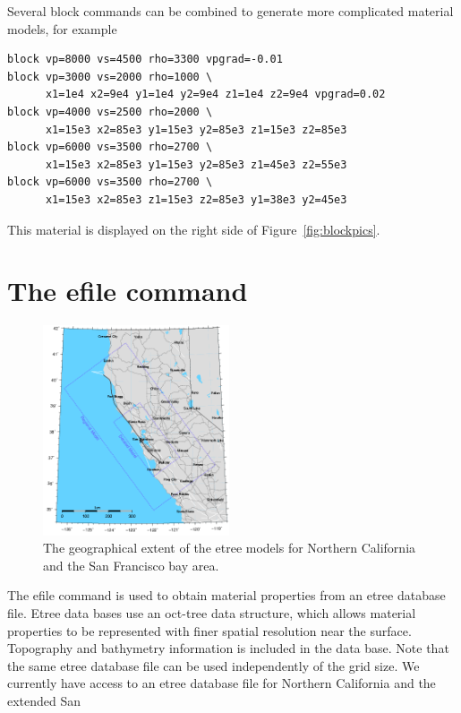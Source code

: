 \documentclass[11pt]{report}
\begin{document}
Several block commands can be combined to generate more complicated material models, for example
\begin{verbatim}
block vp=8000 vs=4500 rho=3300 vpgrad=-0.01
block vp=3000 vs=2000 rho=1000 \
      x1=1e4 x2=9e4 y1=1e4 y2=9e4 z1=1e4 z2=9e4 vpgrad=0.02
block vp=4000 vs=2500 rho=2000 \
      x1=15e3 x2=85e3 y1=15e3 y2=85e3 z1=15e3 z2=85e3
block vp=6000 vs=3500 rho=2700 \
      x1=15e3 x2=85e3 y1=15e3 y2=85e3 z1=45e3 z2=55e3
block vp=6000 vs=3500 rho=2700 \
      x1=15e3 x2=85e3 z1=15e3 z2=85e3 y1=38e3 y2=45e3
\end{verbatim}
This material is displayed on the right side of Figure~\ref{fig:blockpics}.


\section{The efile command} \label{sec:efile}
\begin{figure}
\begin{centering}
  \includegraphics[width=0.49\textwidth]{figures/velmodelbb_roads.png} \hfil
  \caption{The geographical extent of the etree models for Northern California and the San Francisco
  bay area.}
  \label{fig:sfmodel}
\end{centering}
\end{figure}
The efile command is used to obtain material properties from an etree database file. Etree data
bases use an oct-tree data structure, which allows material properties to be represented with finer
spatial resolution near the surface. Topography and bathymetry information is included in the data
base. Note that the same etree database file can be used independently of the grid size. We
currently have access to an etree database file for Northern California and the extended San
\end{document}
